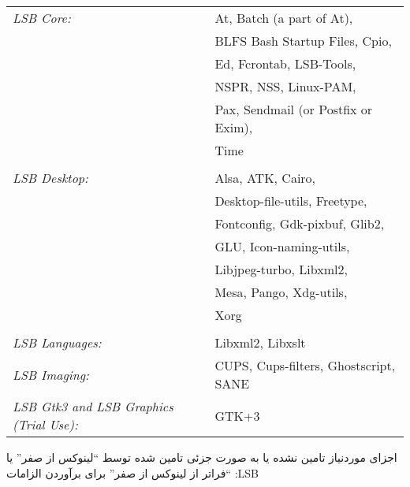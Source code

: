 \documentclass{book}
\begin{document}
\begin{LTR} 

	\vspace{0.1cm}

	\begin{tabular}{@{} l l @{}}
		\textit{LSB Core:} & At, Batch (a part of At),\\ 
					&BLFS Bash Startup Files, Cpio,\\
					&Ed, Fcrontab, LSB-Tools,\\ 
					&NSPR, NSS, Linux-PAM,\\
					&Pax, Sendmail (or Postfix or Exim),\\
					&Time\\
    					\\
		\textit{LSB Desktop:} & Alsa, ATK, Cairo,\\ 
						&Desktop-file-utils, Freetype,\\
						&Fontconfig, Gdk-pixbuf, Glib2,\\ 
						&GLU, Icon-naming-utils,\\
						&Libjpeg-turbo, Libxml2,\\
						&Mesa, Pango, Xdg-utils,\\
						&Xorg\\
						\\
		\textit{LSB Languages:} & Libxml2, Libxslt \\
		\textit{LSB Imaging:} & CUPS, Cups-filters, Ghostscript, SANE \\
		\textit{LSB Gtk3 and LSB Graphics (Trial Use):} & GTK+3 \\
	\end{tabular}

\end{LTR}

\vspace{0.5cm}

\begin{flushright}
اجزای موردنیاز تامین نشده یا به صورت جزئی تامین شده توسط “لینوکس از صفر” یا “فراتر از لینوکس از صفر” برای برآوردن الزامات :LSB
\end{flushright}
\end{document}
